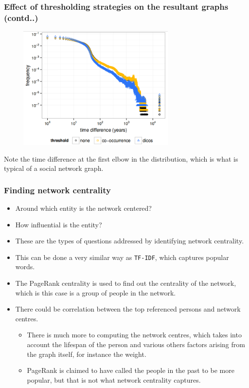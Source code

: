 \documentclass[10pt, compress]{beamer}
\begin{document}
\begin{frame}[fragile]
	\frametitle{\normalsize Effect of thresholding strategies on the resultant graphs {\small (contd..)}}
\vspace{-5mm}
\begin{figure}
	\centering
    \includegraphics[width=0.7\textwidth]{time-span-pdf.png}
\end{figure}

\begin{center}
Note the time difference at the first elbow in the distribution, which is what is typical of a social network graph.
\end{center}
\end{frame}

\begin{frame}[fragile]
	\frametitle{Finding network centrality}
\vspace{-5mm}
\begin{itemize}
\item Around which entity is the network centered?
\item How influential is the entity?
\item These are the types of questions addressed by identifying network centrality.
\item This can be done a very similar way as \texttt{TF-IDF}, which captures popular words.
\item The PageRank centrality is used to find out the centrality of the network, which is this case is a group of people in the network.
\item There could be correlation between the top referenced persons and network centres.
\begin{itemize}
	\item There is much more to computing the network centres, which takes into account the lifespan of the person and various others factors arising from the graph itself, for instance the weight.
    \item PageRank is claimed to have called the people in the past to be more popular, but that is not what network centrality captures.
\end{itemize}
\end{itemize}
\end{frame}
\end{document}
